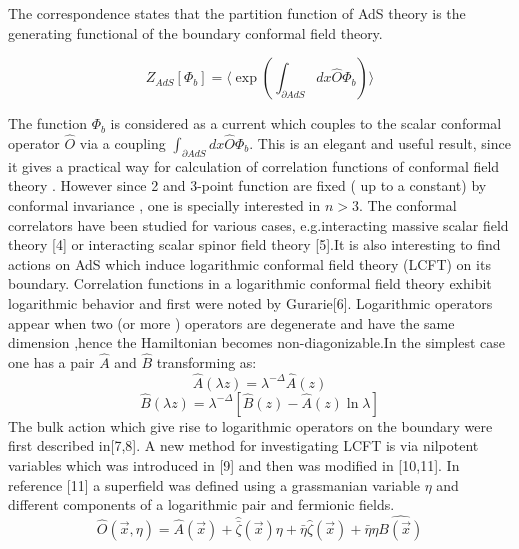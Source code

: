 \documentclass[a4paper,12pt]{article}
\begin{document}
         The correspondence states that the partition function
         of AdS theory is the generating functional of the
         boundary conformal field theory.

               \begin{equation}\label{eq:a2}
               Z_{AdS}[\Phi_{b}]=\langle \exp(\int_{\partial AdS} dx \hat{O}\Phi_b)\rangle
                \end{equation}


         The function $\Phi_b$ is considered as a current which couples to  the
         scalar conformal operator $\hat{O}$ via  a coupling $\int_{\partial AdS}dx
         \hat{O}\Phi_b$.
         This is an elegant and useful result, since it gives a
         practical way for calculation of correlation functions of
         conformal field theory .
        However since 2 and 3-point function are fixed ( up to
         a constant) by conformal invariance , one is specially
         interested in  $n>3$.
         The conformal correlators have been studied for various
         cases, e.g.interacting massive scalar field theory [4] or interacting scalar spinor field
         theory [5].It is also interesting to find actions on AdS which induce logarithmic conformal field
theory (LCFT) on its boundary.
 Correlation functions in a
logarithmic conformal field theory exhibit logarithmic behavior
and first were noted by Gurarie[6]. Logarithmic operators appear
when two (or more ) operators are degenerate and have the same
dimension ,hence the Hamiltonian becomes non-diagonizable.In the
simplest case one has a pair $\hat{A}$ and $\hat{B}$ transforming
as:
 \begin{equation}
 \hat{A}(\lambda z)=\lambda^{-\Delta}\hat{A}(z)\nonumber
 \end{equation}
 \begin{equation}   \label{eq:a3}
\hat{B}(\lambda
z)=\lambda^{-\Delta}[\hat{B}(z)-\hat{A}(z)\ln\lambda]
\end{equation}
The bulk action which give rise to logarithmic operators on the
boundary were first described in[7,8]. A new method for
investigating LCFT is via nilpotent variables which was
introduced in [9] and then was modified in [10,11]. In reference
[11] a superfield was defined using a grassmanian variable $\eta$
and different components of a logarithmic pair and fermionic
fields.
\begin{equation}\label{eq:a4}
\hat{O}(\vec{x},\eta)=\hat{A}(\vec{x})+\hat{\bar{\zeta}}(\vec{x})\eta+\bar{\eta}\hat{\zeta}(\vec{x})+\bar{\eta}\eta\hat{B(\vec{x})}
 \end{equation}
\end{document}

